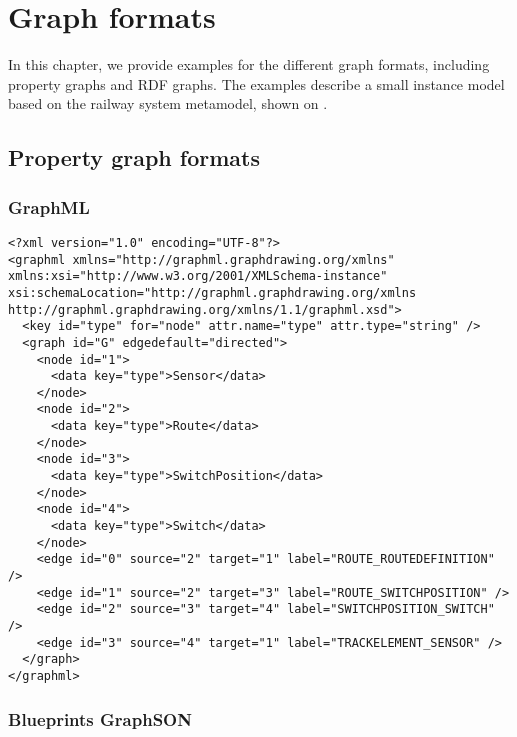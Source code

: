 \appendix
 
\chapter{Graph formats}

In this chapter, we provide examples for the different graph formats, including property graphs and RDF graphs. The examples describe a small instance model based on the railway system metamodel, shown on .

 
\section{Property graph formats}
\label{sec:property-graph-formats}

\subsection{GraphML}
\label{subsec:graphml}

\lstset{language=XML,breaklines=true}
\begin{lstlisting}[caption=A graph based on the railway system metamodel stored in \graphml{} format]
<?xml version="1.0" encoding="UTF-8"?>
<graphml xmlns="http://graphml.graphdrawing.org/xmlns" xmlns:xsi="http://www.w3.org/2001/XMLSchema-instance" xsi:schemaLocation="http://graphml.graphdrawing.org/xmlns http://graphml.graphdrawing.org/xmlns/1.1/graphml.xsd">
  <key id="type" for="node" attr.name="type" attr.type="string" />
  <graph id="G" edgedefault="directed">
    <node id="1">
      <data key="type">Sensor</data>
    </node>
    <node id="2">
      <data key="type">Route</data>
    </node>
    <node id="3">
      <data key="type">SwitchPosition</data>
    </node>
    <node id="4">
      <data key="type">Switch</data>
    </node>
    <edge id="0" source="2" target="1" label="ROUTE_ROUTEDEFINITION" />
    <edge id="1" source="2" target="3" label="ROUTE_SWITCHPOSITION" />
    <edge id="2" source="3" target="4" label="SWITCHPOSITION_SWITCH" />
    <edge id="3" source="4" target="1" label="TRACKELEMENT_SENSOR" />
  </graph>
</graphml>
\end{lstlisting}

\subsection{Blueprints GraphSON}
\label{subsec:blueprints-graphson}

